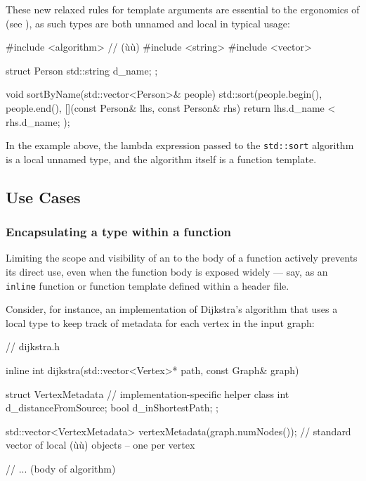 These new relaxed rules for template arguments are essential to the
ergonomics of  (see ), as such types are both
unnamed and local in typical usage:

\begin{emcppslisting}[language=C++]
#include <algorithm> // (ù{}ù)                                               
#include <string>                                                               
#include <vector>

struct Person { std::string d_name; };

void sortByName(std::vector<Person>& people)
{
    std::sort(people.begin(), people.end(),
              [](const Person& lhs, const Person& rhs)
              {
                  return lhs.d_name < rhs.d_name;
              });
}
\end{emcppslisting}
    
\noindent In the example above, the lambda expression passed to the
\lstinline!std::sort! algorithm is a local unnamed type, and the algorithm
itself is a function template.

\subsection[Use Cases]{Use Cases}\label{use-cases}

\subsubsection[Encapsulating a type within a function]{Encapsulating a type within a function}\label{encapsulating-a-type-within-a-function}

Limiting the scope and visibility of an  to the body of a
function actively prevents its direct use, even when the function body
is exposed widely --- say, as an \lstinline!inline! function or function
template defined within a header file.

Consider, for instance, an implementation of Dijkstra's algorithm that
uses a local type to keep track of metadata for each vertex in the input
graph:

\begin{emcppslisting}[language=C++]
// dijkstra.h

inline int dijkstra(std::vector<Vertex>* path, const Graph& graph)
{
    struct VertexMetadata         // implementation-specific helper class
    {
        int  d_distanceFromSource;
        bool d_inShortestPath;
    };

    std::vector<VertexMetadata> vertexMetadata(graph.numNodes());
        // standard vector of local (ù{}ù) objects -- one per vertex

    // ... (body of algorithm)
}
\end{emcppslisting}
    
